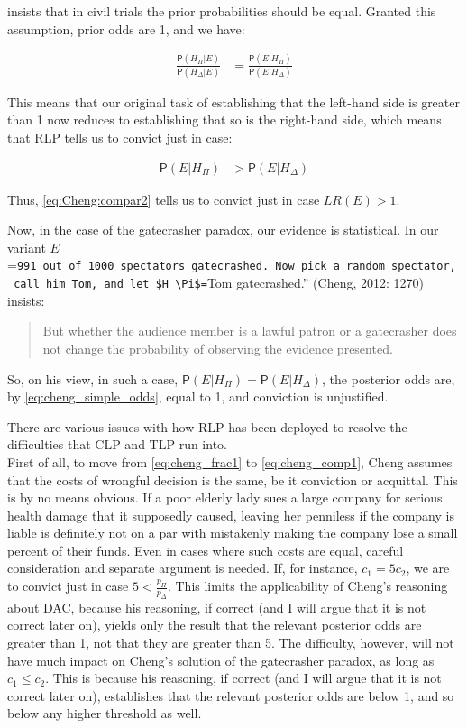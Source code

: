 \documentclass[10pt,dvipsnames,enabledeprecatedfontcommands]{scrartcl}
\newcommand{\pr}[1]{\mathsf{P}(#1)}
\begin{document}
 insists that in civil
trials the prior probabilities should be equal. Granted this assumption,
prior odds are 1, and we have:

\begin{align}\label{eq:cheng_simple_odds}
\frac{\pr{H_\Pi \vert E}}{\pr{H_\Delta \vert E}} & = 
\frac{\pr{E\vert H_\Pi}}{\pr{E\vert H_\Delta}} 
 \end{align}

This means that our original task of establishing that the left-hand
side is greater than 1 now reduces to establishing that so is the
right-hand side, which means that RLP tells us to convict just in case:

\begin{align}\label{eq:Cheng:compar2}
\pr{E\vert H_\Pi} &> \pr{E\vert H_\Delta}
\end{align}

Thus, \eqref{eq:Cheng:compar2} tells us to convict just in case
\(LR(E)>1\).

Now, in the case of the gatecrasher paradox, our evidence is
statistical. In our variant
\(E\)=\texttt{991\ out\ of\ 1000\ spectators\ gatecrashed\textquotesingle{}\textquotesingle{}.\ Now\ pick\ a\ random\ spectator,\ call\ him\ Tom,\ and\ let\ \$H\_\textbackslash{}Pi\$=}Tom
gatecrashed.'' (Cheng, 2012: 1270) insists:

\begin{quote}
But whether the audience member is a lawful patron or a gatecrasher does not change the probability of observing the evidence presented.
\end{quote}

\noindent So, on his view, in such a case,
\(\pr{E\vert H_\Pi}=\pr{E\vert H_\Delta}\), the posterior odds are, by
\eqref{eq:cheng_simple_odds}, equal to 1, and conviction is unjustified.

There are various issues with how RLP has been deployed to resolve the
difficulties that CLP and TLP run into.\\
First of all, to move from \eqref{eq:cheng_frac1} to
\eqref{eq:cheng_comp1}, Cheng assumes that the costs of wrongful
decision is the same, be it conviction or acquittal. This is by no means
obvious. If a poor elderly lady sues a large company for serious health
damage that it supposedly caused, leaving her penniless if the company
is liable is definitely not on a par with mistakenly making the company
lose a small percent of their funds. Even in cases where such costs are
equal, careful consideration and separate argument is needed. If, for
instance, \(c_1=5c_2\), we are to convict just in case
\(5<\frac{p_\Pi}{p_\Delta}\). This limits the applicability of Cheng's
reasoning about DAC, because his reasoning, if correct (and I will argue
that it is not correct later on), yields only the result that the
relevant posterior odds are greater than 1, not that they are greater
than 5. The difficulty, however, will not have much impact on Cheng's
solution of the gatecrasher paradox, as long as \(c_1\leq c_2\). This is
because his reasoning, if correct (and I will argue that it is not
correct later on), establishes that the relevant posterior odds are
below 1, and so below any higher threshold as well.
\end{document}
